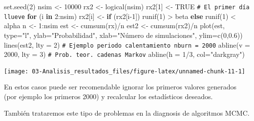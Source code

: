 \documentclass[
  10pt,
]{book}
\newenvironment{Shaded}{\begin{snugshade}}{\end{snugshade}}
\newcommand{\AttributeTok}[1]{\textcolor[rgb]{0.77,0.63,0.00}{#1}}
\newcommand{\CommentTok}[1]{\textcolor[rgb]{0.56,0.35,0.01}{\textit{#1}}}
\newcommand{\ConstantTok}[1]{\textcolor[rgb]{0.00,0.00,0.00}{#1}}
\newcommand{\ControlFlowTok}[1]{\textcolor[rgb]{0.13,0.29,0.53}{\textbf{#1}}}
\newcommand{\DecValTok}[1]{\textcolor[rgb]{0.00,0.00,0.81}{#1}}
\newcommand{\FloatTok}[1]{\textcolor[rgb]{0.00,0.00,0.81}{#1}}
\newcommand{\FunctionTok}[1]{\textcolor[rgb]{0.00,0.00,0.00}{#1}}
\newcommand{\NormalTok}[1]{#1}
\newcommand{\OtherTok}[1]{\textcolor[rgb]{0.56,0.35,0.01}{#1}}
\newcommand{\SpecialCharTok}[1]{\textcolor[rgb]{0.00,0.00,0.00}{#1}}
\newcommand{\StringTok}[1]{\textcolor[rgb]{0.31,0.60,0.02}{#1}}
\theoremstyle{break}
\theoremstyle{nonumberplain}
\renewcommand{\CommentTok}[1]{\textcolor[rgb]{0.41,0.41,0.41}{\texttt{#1}}}
\begin{document}
\begin{Shaded}
\begin{Highlighting}[]
\FunctionTok{set.seed}\NormalTok{(}\DecValTok{2}\NormalTok{)}
\NormalTok{nsim }\OtherTok{\textless{}{-}} \DecValTok{10000}
\NormalTok{rx2 }\OtherTok{\textless{}{-}} \FunctionTok{logical}\NormalTok{(nsim)}
\NormalTok{rx2[}\DecValTok{1}\NormalTok{] }\OtherTok{\textless{}{-}} \ConstantTok{TRUE} \CommentTok{\# El primer día llueve}
\ControlFlowTok{for}\NormalTok{ (i }\ControlFlowTok{in} \DecValTok{2}\SpecialCharTok{:}\NormalTok{nsim)}
\NormalTok{  rx2[i] }\OtherTok{\textless{}{-}} \ControlFlowTok{if}\NormalTok{ (rx2[i}\DecValTok{{-}1}\NormalTok{]) }\FunctionTok{runif}\NormalTok{(}\DecValTok{1}\NormalTok{) }\SpecialCharTok{\textgreater{}}\NormalTok{ beta }\ControlFlowTok{else} \FunctionTok{runif}\NormalTok{(}\DecValTok{1}\NormalTok{) }\SpecialCharTok{\textless{}}\NormalTok{ alpha}
\NormalTok{n }\OtherTok{\textless{}{-}} \DecValTok{1}\SpecialCharTok{:}\NormalTok{nsim}
\NormalTok{est }\OtherTok{\textless{}{-}} \FunctionTok{cumsum}\NormalTok{(rx)}\SpecialCharTok{/}\NormalTok{n}
\NormalTok{est2 }\OtherTok{\textless{}{-}} \FunctionTok{cumsum}\NormalTok{(rx2)}\SpecialCharTok{/}\NormalTok{n}
\FunctionTok{plot}\NormalTok{(est, }\AttributeTok{type=}\StringTok{"l"}\NormalTok{, }\AttributeTok{ylab=}\StringTok{"Probabilidad"}\NormalTok{, }
     \AttributeTok{xlab=}\StringTok{"Número de simulaciones"}\NormalTok{, }\AttributeTok{ylim=}\FunctionTok{c}\NormalTok{(}\DecValTok{0}\NormalTok{,}\FloatTok{0.6}\NormalTok{))}
\FunctionTok{lines}\NormalTok{(est2, }\AttributeTok{lty =} \DecValTok{2}\NormalTok{)}
\CommentTok{\# Ejemplo periodo calentamiento nburn = 2000}
\FunctionTok{abline}\NormalTok{(}\AttributeTok{v =} \DecValTok{2000}\NormalTok{, }\AttributeTok{lty =} \DecValTok{3}\NormalTok{)}
\CommentTok{\# Prob. teor. cadenas Markov}
\FunctionTok{abline}\NormalTok{(}\AttributeTok{h =} \DecValTok{1}\SpecialCharTok{/}\DecValTok{3}\NormalTok{, }\AttributeTok{col=}\StringTok{"darkgray"}\NormalTok{)     }
\end{Highlighting}
\end{Shaded}

\begin{center}\texttt{[image: 03-Analisis\_resultados\_files/figure-latex/unnamed-chunk-11-1]} \end{center}

En estos casos puede ser recomendable ignorar los primeros valores generados (por ejemplo los primeros 2000) y recalcular los
estadísticos deseados.

También trataremos este tipo de problemas en la diagnosis de algoritmos MCMC.
\end{document}
